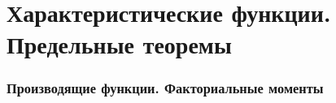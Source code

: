 \part{Характеристические функции. Предельные теоремы}
\setcounter{equation}{0}
\section{Производящие функции. Факториальные моменты}
